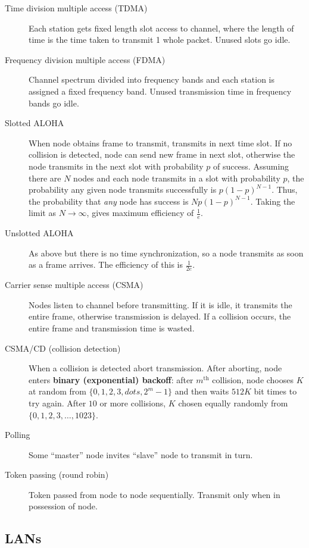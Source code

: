 \documentclass{article}
\begin{document}
\begin{description}
    \item[Time division multiple access (TDMA)] Each station gets fixed length slot access to channel,
    where the length of time is the time taken to transmit 1 whole packet. Unused slots go idle.
    \item[Frequency division multiple access (FDMA)] Channel spectrum divided into frequency bands and 
    each station is assigned a fixed frequency band. Unused transmission time in frequency bands go idle.
    \item[Slotted ALOHA] When node obtains frame to transmit, transmits in next time slot. If no 
    collision is detected, node can send new frame in next slot, otherwise the node transmits in the 
    next slot with probability $p$ of success. Assuming there are $N$ nodes and each node transmits in a
    slot with probability $p$, the probability any given node transmits successfully is $p(1-p)^{N-1}$.
    Thus, the probability that \textit{any} node has success is $Np(1-p)^{N-1}$. Taking the limit as
    $N\to\infty$, gives maximum efficiency of $\frac1e$.
    \item[Unslotted ALOHA] As above but there is no time synchronization, so a node transmits as soon as
    a frame arrives. The efficiency of this is $\frac1{2e}$.
    \item[Carrier sense multiple access (CSMA)] Nodes listen to channel before transmitting. If it is idle,
    it transmits the entire frame, otherwise transmission is delayed. If a collision occurs, the entire
    frame and transmission time is wasted.
    \item[CSMA/CD (collision detection)] When a collision is detected abort transmission. After aborting,
    node enters \textbf{binary (exponential) backoff}: after $m^\text{th}$ collision, node chooses $K$
    at random from $\{0,1,2,3,dots,2^m-1\}$ and then waits $512K$ bit times to try again. After $10$ or 
    more collisions, $K$ chosen equally randomly from $\{0,1,2,3,\dots,1023\}$.
    \item[Polling] Some ``master'' node invites ``slave'' node to transmit in turn.
    \item[Token passing (round robin)] Token passed from node to node sequentially. Transmit only when
    in possession of node.
\end{description}

\subsection*{LANs}
\end{document}
